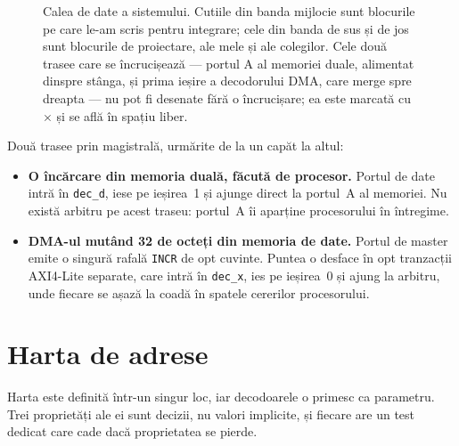 \documentclass[11pt,openany]{report}
\newcommand{\sig}[1]{\texttt{#1}}
\newcommand{\mdl}[1]{\texttt{#1}}
\begin{document}
\begin{figure}[H]
{}
\caption{Calea de date a sistemului. Cutiile din banda mijlocie sunt blocurile
pe care le-am scris pentru integrare; cele din banda de sus și de jos sunt
blocurile de proiectare, ale mele și ale colegilor. Cele două trasee care se
încrucișează --- portul A al memoriei duale, alimentat dinspre stânga, și
prima ieșire a decodorului DMA, care merge spre dreapta --- nu pot fi desenate
fără o încrucișare; ea este marcată cu $\times$ și se află în spațiu liber.}
\label{fig:soc}
\end{figure}

Două trasee prin magistrală, urmărite de la un capăt la altul:

\begin{itemize}[itemsep=3pt,topsep=3pt]
\item \textbf{O încărcare din memoria duală, făcută de procesor.} Portul de date
      intră în \mdl{dec\_d}, iese pe ieșirea~1 și ajunge direct la portul~A al
      memoriei. Nu există arbitru pe acest traseu: portul~A îi aparține
      procesorului în întregime.
\item \textbf{DMA-ul mutând 32 de octeți din memoria de date.} Portul de master
      emite o singură rafală \sig{INCR} de opt cuvinte. Puntea o desface în opt
      tranzacții AXI4-Lite separate, care intră în \mdl{dec\_x}, ies pe
      ieșirea~0 și ajung la arbitru, unde fiecare se așază la coadă în spatele
      cererilor procesorului.
\end{itemize}

\section{Harta de adrese}

Harta este definită într-un singur loc, iar decodoarele o primesc ca parametru.
Trei proprietăți ale ei sunt decizii, nu valori implicite, și fiecare are un
test dedicat care cade dacă proprietatea se pierde.
\end{document}
